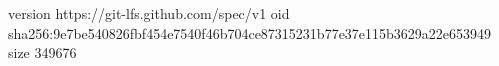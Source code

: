 version https://git-lfs.github.com/spec/v1
oid sha256:9e7be540826fbf454e7540f46b704ce87315231b77e37e115b3629a22e653949
size 349676
